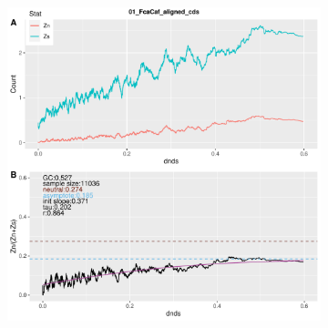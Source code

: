\begin{figure}[H]
     \begin{subfigure}[b]{0.5\textwidth}
      \centering
     \includegraphics[page=4,width=1\linewidth,height=1.2\linewidth]{Figure/roll_ZnZs_max.pdf}
     \end{subfigure}%
     \begin{subfigure}[b]{0.5\textwidth}
      \centering

\end{subfigure}
\end{figure}
